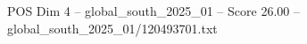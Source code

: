 \begin{textsample}{POS Dim 4 – global\_south\_2025\_01 – Score 26.00 – global\_south\_2025\_01/120493701.txt}
\end{textsample}
